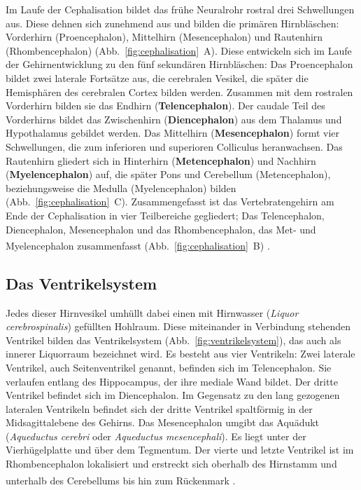 \documentclass[12pt,a4paper,pdftex]{article}
\begin{document}
\noindent Im Laufe der Cephalisation bildet das frühe Neuralrohr rostral drei Schwellungen aus. Diese dehnen sich zunehmend aus und bilden die primären Hirnbläschen: Vorderhirn (Proencephalon), Mittelhirn (Mesencephalon) und Rautenhirn (Rhombencephalon) (Abb.~\ref{fig:cephalisation}~A). Diese entwickeln sich im Laufe der Gehirnentwicklung zu den fünf sekundären Hirnbläschen: Das Proencephalon bildet zwei laterale Fortsätze aus, die cerebralen Vesikel,  die später die Hemisphären des cerebralen Cortex bilden werden. Zusammen mit dem rostralen Vorderhirn bilden sie das Endhirn (\textbf{Telencephalon}). Der caudale Teil des Vorderhirns bildet das Zwischenhirn (\textbf{Diencephalon}) aus dem Thalamus und Hypothalamus gebildet werden. Das Mittelhirn (\textbf{Mesencephalon}) formt vier Schwellungen, die zum inferioren und superioren Colliculus heranwachsen. Das Rautenhirn gliedert sich in Hinterhirn (\textbf{Metencephalon}) und Nachhirn (\textbf{Myelencephalon}) auf, die später Pons und Cerebellum (Metencephalon), beziehungsweise die Medulla (Myelencephalon) bilden (Abb.~\ref{fig:cephalisation}~C). Zusammengefasst ist das Vertebratengehirn am Ende der Cephalisation in vier Teilbereiche gegliedert; Das Telencephalon, Diencephalon, Mesencephalon und das Rhombencephalon, das Met- und Myelencephalon zusammenfasst (Abb.~\ref{fig:cephalisation}~B) \textsuperscript{\cite[10]{watson2010thebrain}}.

\subsection{Das Ventrikelsystem}
\label{subsec:} 

Jedes dieser Hirnvesikel umhüllt dabei einen mit Hirnwasser (\textit{Liquor cerebrospinalis}) gefüllten Hohlraum. Diese miteinander in Verbindung stehenden Ventrikel bilden das Ventrikelsystem (Abb.~\ref{fig:ventrikelsystem}), das auch als innerer Liquorraum  bezeichnet wird. Es besteht aus vier Ventrikeln: Zwei laterale Ventrikel, auch Seitenventrikel genannt, befinden sich im Telencephalon. Sie verlaufen entlang des Hippocampus, der ihre mediale Wand bildet. Der dritte Ventrikel befindet sich im Diencephalon. Im Gegensatz zu den lang gezogenen lateralen Ventrikeln befindet sich der dritte Ventrikel spaltförmig in der Midsagittalebene des Gehirns. Das Mesencephalon umgibt das Aquädukt (\textit{Aqueductus cerebri} oder \textit{Aqueductus mesencephali}). Es liegt unter der Vierhügelplatte und über dem Tegmentum. Der vierte und letzte Ventrikel ist im Rhombencephalon lokalisiert und erstreckt sich oberhalb des Hirnstamm und unterhalb des Cerebellums bis hin zum Rückenmark
\textsuperscript{\cite[2]{watson2010thebrain}}.
\end{document}
